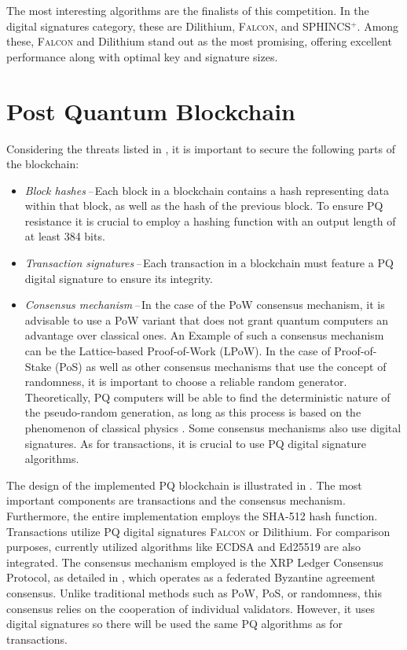\documentclass{ExcelAtFIT}
\begin{document}
The most interesting algorithms are the finalists of this competition. In the digital signatures category, these are Dilithium, \textsc{Falcon}, and SPHINCS$^+$. Among these, \textsc{Falcon} and Dilithium stand out as the most promising, offering excellent performance along with optimal key and signature sizes.

\section{Post Quantum Blockchain}
\label{sec:PQB}

Considering the threats listed in , it is important to secure the following parts of the blockchain:

\begin{itemize}
    \item \emph{Block hashes\,--\,}Each block in a blockchain contains a hash representing data within that block, as well as the hash of the previous block. To ensure PQ resistance it is crucial to employ a hashing function with an output length of at least 384 bits.
    \item \emph{Transaction signatures\,--\,}Each transaction in a blockchain must feature a PQ digital signature to ensure its integrity.
    \item \emph{Consensus mechanism\,--\,}In the case of the PoW consensus mechanism, it is advisable to use a PoW variant that does not grant quantum computers an advantage over classical ones. An Example of such a consensus mechanism can be the Lattice-based Proof-of-Work (LPoW). In the case of Proof-of-Stake (PoS) as well as other consensus mechanisms that use the concept of randomness, it is important to choose a reliable random generator. Theoretically, PQ computers will be able to find the deterministic nature of the pseudo-random generation, as long as this process is based on the phenomenon of classical physics \cite{PRNG.Jack}. Some consensus mechanisms also use digital signatures. As for transactions, it is crucial to use PQ digital signature algorithms.
\end{itemize}


The design of the implemented PQ blockchain is illustrated in . The most important components are transactions and the consensus mechanism. Furthermore, the entire implementation employs the SHA-512 hash function. Transactions utilize PQ digital signatures \textsc{Falcon} or Dilithium. For comparison purposes, currently utilized algorithms like ECDSA and Ed25519 are also integrated. The consensus mechanism employed is the XRP Ledger Consensus Protocol, as detailed in \cite{xrp.consensus.mechanism}, which operates as a federated Byzantine agreement consensus. Unlike traditional methods such as PoW, PoS, or randomness, this consensus relies on the cooperation of individual validators. However, it uses digital signatures so there will be used the same PQ algorithms as for transactions.
\end{document}
